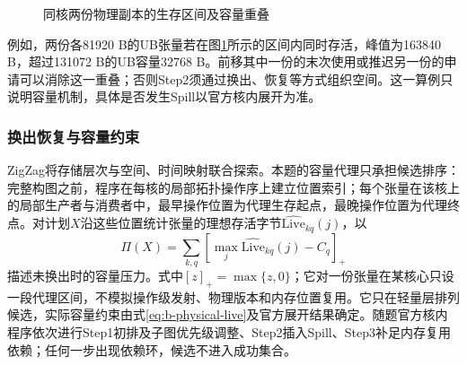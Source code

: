 \begin{figure}[H]\centering
{}
\caption{同核两份物理副本的生存区间及容量重叠}\label{fig:b-lifetime}
\end{figure}

例如，两份各81920 B的UB张量若在图\ref{fig:b-lifetime}所示的区间内同时存活，峰值为163840 B，超过131072 B的UB容量32768 B。前移其中一份的末次使用或推迟另一份的申请可以消除这一重叠；否则Step2须通过换出、恢复等方式组织空间。这一算例只说明容量机制，具体是否发生Spill以官方核内展开为准。

\subsubsection{换出恢复与容量约束}
ZigZag将存储层次与空间、时间映射联合探索\cite{mei2021zigzag}。本题的容量代理只承担候选排序：完整构图之前，程序在每核的局部拓扑操作序上建立位置索引；每个张量在该核上的局部生产者与消费者中，最早操作位置为代理生存起点，最晚操作位置为代理终点。对计划$X$沿这些位置统计张量的理想存活字节$\widehat{\mathrm{Live}}_{kq}(j)$，以
\begin{equation}
\Pi(X)=\sum_{k,q}\left[\max_j\widehat{\mathrm{Live}}_{kq}(j)-C_q\right]_+
\label{eq:pressure}
\end{equation}
描述未换出时的容量压力。式中$[z]_+=\max\{z,0\}$；它对一份张量在某核心只设一段代理区间，不模拟操作级发射、物理版本和内存位置复用。它只在轻量层排列候选，实际容量约束由式\eqref{eq:b-physical-live}及官方展开结果确定。随题官方核内程序依次进行Step1初排及子图优先级调整、Step2插入Spill、Step3补足内存复用依赖；任何一步出现依赖环，候选不进入成功集合。

